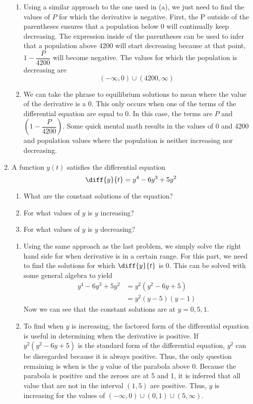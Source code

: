 \documentclass{article}
\begin{document}
\begin{enumerate}[label=\textbf{\arabic*.}]
\begin{enumerate}[label = (\alph*)]
\item Using a similar approach to the one used in (a), we just need to find the values of $P$ for which the derivative is negative. First, the P outside of the parentheses ensures that a population below 0 will continually keep decreasing. The expression inside of the parentheses can be used to infer that a population above 4200 will start decreasing because at that point, $1-\dfrac{P}{4200}$ will become negative. The values for which the population is decreasing are \[(-\infty, 0)\cup (4200,\infty)\]

\item We can take the phrase to equilibrium solutions to mean where the value of the derivative is a 0. This only occurs when one of the terms of the differential equation are equal to 0. In this case, the terms are $P$ and $\left(1-\dfrac{P}{4200}\right)$. Some quick mental math results in the values of 0 and 4200 and population values where the population is neither increasing nor decreasing.
\end{enumerate}

\newpage

\item A function $y(t)$ satisfies the differential equation 
\[\diff{y}{t} = y^4-6y^3+5y^2\]
\begin{enumerate}[label = (\alph*)]
\item What are the constant solutions of the equation?
\item For what values of $y$ is $y$ increasing?
\item For what values of $y$ is $y$ decreasing?
\end{enumerate}


\vspace{5pt}
\begin{enumerate}[label = (\alph*)]
\item Using the same approach as the last problem, we simply solve the right hand side for when derivative is in a certain range. For this part, we need to find the solutions for which $\diff{y}{t}$ is 0. This can be solved with some general algebra to yield
\begin{align*}
y^4-6y^3+5y^2 &= y^2(y^2-6y+5)\\
&= y^2(y-5)(y-1)
\end{align*}
Now we can see that the constant solutions are at $y=0, 5, 1$. 

\item To find when $y$ is increasing, the factored form of the differential equation is useful in determining when the derivative is positive. If $y^2(y^2-6y+5)$ is the standard form of the differential equation, $y^2$ can be disregarded because it is always positive. Thus, the only question remaining is when is the $y$ value of the parabola above 0. Because the parabola is positive and the zeroes are at 5 and 1, it is inferred that all value that are not in the interval $(1,5)$ are positive. Thus, $y$ is increasing for the values of $(-\infty,0)\cup(0,1)\cup(5,\infty)$.


\end{enumerate}
\end{enumerate}
\end{document}
